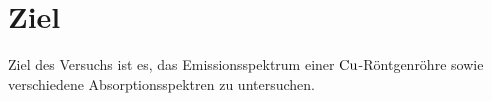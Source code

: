 \section{Ziel}
\label{sec:Ziel}

Ziel des Versuchs ist es, das Emissionsspektrum einer $\ce{Cu}$-Röntgenröhre sowie verschiedene Absorptionsspektren zu untersuchen.